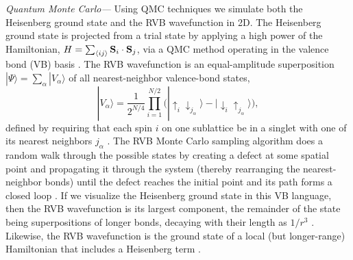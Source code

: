 \documentclass[prb,aps,twocolumn,floatfix,amsmath,amssymb,superscriptaddress,tightenlines]{revtex4}
\begin{document}
\smallskip 
{\it Quantum Monte Carlo---}
Using QMC techniques we simulate both the
Heisenberg ground state and the RVB
wavefunction in 2D.  The Heisenberg ground state is
projected from a trial state by applying a high power of the
Hamiltonian, $H = \sum_{\langle ij \rangle} {\bf S}_i \cdot {\bf S}_j$, via a QMC method operating in the valence bond (VB)
basis \cite{Sandvik}. 
The RVB wavefunction 
is an equal-amplitude superposition 
$| \Psi \rangle = \sum_{\alpha} | V_{\alpha} \rangle$
of all nearest-neighbor valence-bond states, 
\begin{equation}
|V_{\alpha} \rangle =  \frac{1}{2^{N/4}} \prod_{i=1}^{N/2} \big( | \uparrow_i \downarrow_{j_{\alpha}} \rangle -  | \downarrow_i  \uparrow_{j_{\alpha}} \rangle \big),
\end{equation}
 defined by requiring that each spin $i$ on one sublattice be in a singlet with one of its nearest neighbors $j_\alpha$ \cite{RVB1,RVB2}. The RVB 
Monte Carlo sampling
algorithm does a random walk through the possible states by creating a
defect at some spatial point and propagating it through the system (thereby
rearranging the nearest-neighbor bonds) until the defect reaches the
initial point and its path forms a closed loop \cite{AWSloop}.
If we visualize the Heisenberg ground state in this VB language, then the RVB wavefunction is its largest component, the remainder of the state being superpositions of longer bonds, decaying with their length as $1/r^3$ \cite{Sandvik}.  Likewise, the RVB wavefunction is the ground state of a local (but longer-range) Hamiltonian that includes a Heisenberg term \cite{Cano}.
\end{document}
